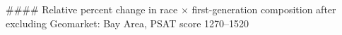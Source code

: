 #### Relative percent change in race × first-generation composition after excluding Geomarket: Bay Area, PSAT score 1270–1520
